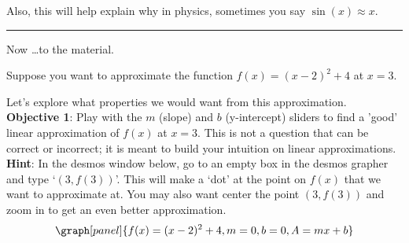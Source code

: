 \documentclass[handout,nooutcomes]{ximera}
\begin{document}
Also, this will help explain why in physics, sometimes you say $\sin(x)\approx x$.\\

\hrule
\bigskip

Now \dots to the material.\\
\medskip

Suppose you want to approximate the function $f(x) = (x-2)^2  + 4$ at $x=3$.

Let's explore what properties we would want from this approximation.\\


{\bf Objective 1}: Play with the $m$ (slope) and $b$ (y-intercept) sliders to find
a 'good' linear approximation of $f(x)$ at $x=3$. This is not a question
that can be correct or incorrect; it is meant to build your intuition
on linear approximations.\\

\textbf{Hint}: In the desmos window below, go to an empty box in the 
desmos grapher and type `$(3,f(3))$'. This will make a `dot' at the point
on $f(x)$ that we want to approximate at. You may also want center
the point $(3, f(3))$ and zoom in to get an even better approximation.
\[
\graph[panel]{f(x) = (x-2)^2 + 4, m=0, b=0, A=mx+b}
\]
\end{document}
